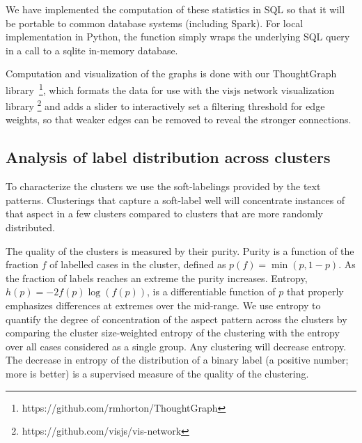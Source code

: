 We have implemented the computation of these statistics in SQL so that it will be portable to common database systems (including Spark). For local implementation in Python, the function simply wraps the underlying SQL query in a call to a sqlite in-memory database.

Computation and visualization of the graphs is done with our ThoughtGraph library~\footnote{https://github.com/rmhorton/ThoughtGraph}, which formats the data for use with the visjs network visualization library \footnote{https://github.com/visjs/vis-network} and adds a slider to interactively set a filtering threshold for edge weights, so that weaker edges can be removed to reveal the stronger connections.



\subsection{Analysis of label distribution across clusters}

To characterize the clusters we use the soft-labelings provided by the text patterns. Clusterings that capture a soft-label well will concentrate instances of that aspect in a few clusters compared to clusters that are more randomly distributed.


The quality of the clusters is measured by their purity. Purity is a function of the fraction $f$ of labelled cases in the cluster, defined as $p(f) = \min(p, 1-p)$. As the fraction of labels reaches an extreme the purity increases. Entropy, $h(p) = - 2f(p)\log(f(p))$, is a differentiable function of $p$ that properly emphasizes differences at extremes over the mid-range. We use entropy to quantify the 
degree of concentration of the aspect pattern across the clusters by comparing the cluster size-weighted entropy of the clustering with the entropy over all cases considered as a single group.  Any clustering will decrease entropy. The decrease in entropy of the distribution of a binary label (a positive number; more is better) is a supervised measure of the quality of the clustering. 

